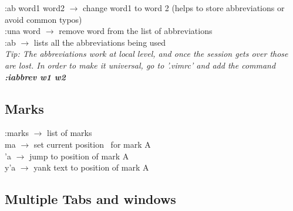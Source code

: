 \documentclass[twoside,a4paper]{article}
\newcommand{\tcb}{\color{blue}}
\newcommand{\tcc}{\color{cyan}}
\newcommand{\tcr}{\color{red}}
\newcommand{\tcg}{\color{gray}}
\newcommand{\tck}{\color{black}}
\newcommand{\ra }{$\rightarrow$ }
\newcommand{\hs}{\hspace}
\begin{document}
\begin{multicols}{2}
		\tcr :ab \tcb  word1 word2 \tck 
		\ra change word1 to word 2 (helps to store 
		abbreviations or avoid common typos)\\
		\tcr :una \tcb  word \tck $\rightarrow$
		remove word from the list of abbreviations\\
		\tcr :ab \tck \ra lists all the
		abbreviations being used\\

		\hs{-0.5 cm}\tcg \textit{Tip: The abbreviations work 
		at local level, and once the session gets over those are lost.
		In order to make it universal, go to '.vimrc' and add the 
		command \textbf{:iabbrev w1 w2} }

		\tcc \subsection{Marks}

		\tcr :marks \tck \ra list of marks\\
		\tcr ma \tck \ra set current position \
		for mark A\\
		\tcr 'a \tck \ra jump to position of 
		mark A\\
		\tcr y'a \tck \ra yank text to position
		of mark A

	\vspace{1 cm}
	\tcc \subsection{Multiple Tabs and windows}


\end{multicols}
\end{document}

